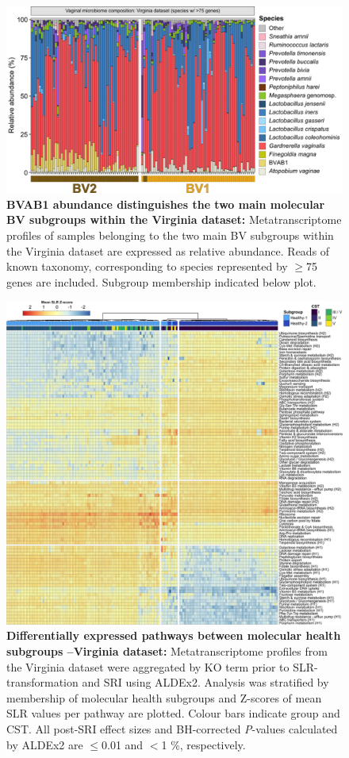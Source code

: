 \documentclass[sn-mathphys,Numbered]{sn-jnl}%
\begin{document}
\begin{figure}[H]
    \centering
    \includegraphics[scale = 0.875]{0_supplFig7.png}
    \caption{\textbf{BVAB1 abundance distinguishes the two main molecular BV subgroups within the Virginia dataset:} Metatranscriptome profiles of samples belonging to the two main BV subgroups within the Virginia dataset are expressed as relative abundance. Reads of known taxonomy, corresponding to species represented by $\geq$75 genes are included. Subgroup membership indicated below plot.} \label{fig:sfigVirgBVstackedBars}
\end{figure}
\newpage

\begin{figure}[H]
    \centering
    \includegraphics[scale = 0.77]{0_supplFig8.png}
    \caption{\textbf{Differentially expressed pathways between molecular health subgroups --Virginia dataset:} Metatranscriptome profiles from the Virginia dataset were aggregated by KO term prior to SLR-transformation and SRI using ALDEx2. Analysis was stratified by membership of molecular health subgroups and Z-scores of mean SLR values per pathway are plotted. Colour bars indicate group and CST. All post-SRI effect sizes and BH-corrected \textit{P}-values calculated by ALDEx2 are $\leq$0.01 and $<$1 \%, respectively.} \label{fig:sfigVirgHsubgroups}
\end{figure}
\newpage
\end{document}
